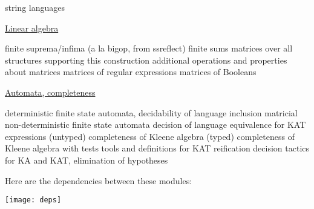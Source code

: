 \documentclass[a4paper]{llncs}
\begin{document}
\begin{description}
\begin{description}
    string languages
  \end{description}
  \item {}\ul{Linear algebra}
  \begin{description}
     finite suprema/infima (a la bigop, from ssreflect)
     finite sums
     matrices over all structures
    supporting this construction
     additional operations and
    properties about matrices
     matrices of regular expressions
     matrices of Booleans
  \end{description}
  \item {}\ul{Automata, completeness}
  \begin{description}
     deterministic finite state automata, decidability of language inclusion
     matricial non-deterministic finite state automata
     decision of language equivalence for KAT expressions
     (untyped) completeness of Kleene algebra 
     (typed) completeness of Kleene
    algebra with tests
     tools and definitions for KAT reification
     decision tactics for KA and KAT,
    elimination of hypotheses
  \end{description}
\end{description}


\clearpage

Here are the dependencies between these modules:

\bigskip
\noindent\hspace{-.1\linewidth}
\texttt{[image: deps]}
\end{document}
